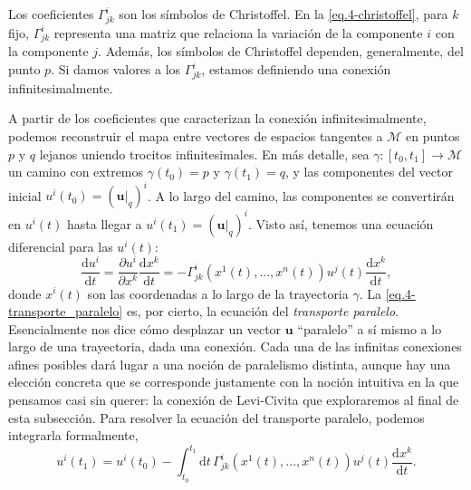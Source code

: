 Los coeficientes \(\Gamma^{i}_{jk}\) son los símbolos de Christoffel. En la \cref{eq.4-christoffel}, para \(k\) fijo, \(\Gamma^{i}_{jk}\) representa una matriz que relaciona la variación de la componente \(i\) con la componente \(j\). Además, los símbolos de Christoffel dependen, generalmente, del punto \(p\). Si damos valores a los \(\Gamma^{i}_{jk}\), estamos definiendo una conexión infinitesimalmente.

A partir de los coeficientes que caracterizan la conexión infinitesimalmente, podemos reconstruir el mapa entre vectores de espacios tangentes a \(\mathcal{M}\) en puntos \(p\) y \(q\) lejanos uniendo trocitos infinitesimales. En más detalle, sea \(\gamma:[t_0, t_1]\rightarrow\mathcal{M}\) un camino con extremos \(\gamma(t_0) = p\) y \(\gamma(t_1) = q\), y las componentes del vector inicial \(u^i(t_0) = \left(\mathbf{u}|_q\right)^i\). A lo largo del camino, las componentes se convertirán en \(u^i(t)\) hasta llegar a \(u^i(t_1) = \left(\mathbf{u}|_q\right)^i\). Visto así, tenemos una ecuación diferencial para las \(u^i(t)\):
\begin{equation}
    \label{eq.4-transporte_paralelo}
    \frac{\mathrm{d}u^i}{\mathrm{d}t} = \frac{\partial u^i}{\partial x^k} \frac{\mathrm{d}x^k}{\mathrm{d}t} = -\Gamma^{i}_{jk}\left(x^1(t),..., x^n(t)\right)u^j(t) \frac{\mathrm{d}x^k}{\mathrm{d}t},
\end{equation}
donde \(x^i(t)\) son las coordenadas a lo largo de la trayectoria \(\gamma\). La \cref{eq.4-transporte_paralelo} es, por cierto, la ecuación del \emph{transporte paralelo}. Esencialmente nos dice cómo desplazar un vector \(\mathbf{u}\) ``paralelo'' a sí mismo a lo largo de una trayectoria, dada una conexión. Cada una de las infinitas conexiones afines posibles dará lugar a una noción de paralelismo distinta, aunque hay una elección concreta que se corresponde justamente con la noción intuitiva en la que pensamos casi sin querer: la conexión de Levi-Civita que exploraremos al final de esta subsección. Para resolver la ecuación del transporte paralelo, podemos integrarla formalmente,
\begin{equation}
    \label{eq.4-transporte_integral}
    u^i(t_1) = u^i(t_0) - \int_{t_0}^{t_1}\mathrm{d}t\, \Gamma^{i}_{jk} \left(x^1(t),...,x^n(t)\right) u^j(t) \frac{\mathrm{d}x^k}{\mathrm{d}t}.
\end{equation}

